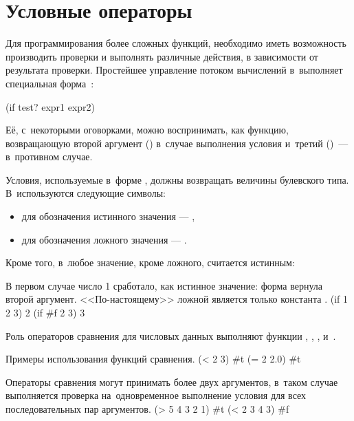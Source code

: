 \section[2]{Условные операторы}%
Для программирования более сложных функций, необходимо иметь возможность производить проверки и выполнять различные действия, в зависимости от результата проверки. 
Простейшее управление потоком вычислений в~\Scheme выполняет специальная форма~:
\begin{SchemeCode}
(if test? expr1 expr2)
\end{SchemeCode}

\noindent Её, с~некоторыми оговорками, можно воспринимать, как функцию, возвращающую второй аргумент () в~случае выполнения условия  и~третий ()~--- в~противном случае.

Условия, используемые в~форме , должны возвращать величины булевского типа. В~\Scheme используются следующие символы:
\begin{itemize}[--]
 \item для обозначения истинного значения --- ,

 \item для обозначения ложного значения --- .
\end{itemize}

Кроме того, в~\Scheme любое значение, кроме ложного, считается истинным:

\begin{example}{%
В первом случае число 1 сработало, как истинное значение: форма  вернула второй аргумент. <<По-настоящему>> ложной является только константа .}
\REPL
  {(if 1 2 3)}
  {2}
\REPL
  {(if \#f 2 3)}
  {3}
\end{example}


Роль операторов сравнения для числовых данных выполняют функции \s{=}, \s{<}, \s{>}, \s{<=} и~\s{>=}.

\begin{example}{%
Примеры использования функций сравнения.}
\REPL
  {(< 2 3)}
  {\#t}
\REPL
  {(= 2 2.0)}
  {\#t}
\end{example}

\vspace{-\medskipamount}
\begin{example}{%
Операторы сравнения могут принимать более двух аргументов, в~таком случае выполняется проверка на~одновременное выполнение условия для всех последовательных пар аргументов.}
\REPL
  {(> 5 4 3 2 1)}
  {\#t}
\REPL
  {(< 2 3 4 3)}
  {\#f}
\end{example}

